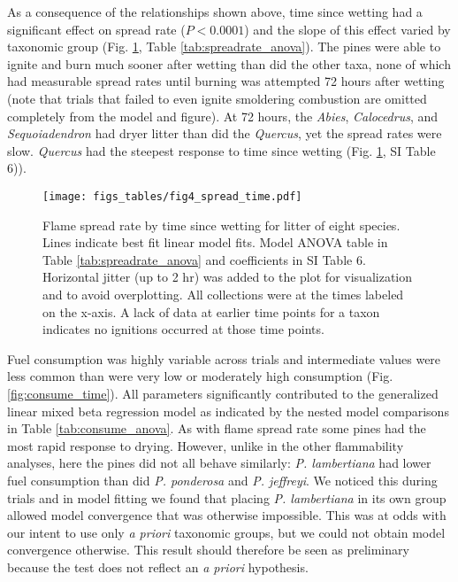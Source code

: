\documentclass[letterpaper,12pt]{article}
\begin{document}
As a consequence of the relationships shown above, time since wetting had a
significant effect on spread rate ($P < 0.0001$) and the slope of this effect
varied by taxonomic group (Fig. \ref{fig:spread_time}, Table
\ref{tab:spreadrate_anova}). The pines were able to ignite and burn much sooner
after wetting than did the other taxa, none of which had measurable spread
rates until burning was attempted 72 hours after wetting (note that trials that
failed to even ignite smoldering combustion are omitted completely from the
model and figure). At 72 hours, the \emph{Abies}, \emph{Calocedrus}, and
\emph{Sequoiadendron} had dryer litter than did the \emph{Quercus}, yet the
spread rates were slow. \emph{Quercus} had the steepest response to time since
wetting (Fig. \ref{fig:spread_time}, SI Table 6)).


\begin{figure}[h]
  \centering
\texttt{[image: figs\_tables/fig4\_spread\_time.pdf]}
\caption{Flame spread rate by time since wetting for litter of eight species.
  Lines indicate best fit linear model fits. Model ANOVA table in Table
  \ref{tab:spreadrate_anova} and coefficients in SI Table 6. Horizontal jitter
  (up to 2 hr) was added to the plot for visualization and to avoid
  overplotting. All collections were at the times labeled on the x-axis. A lack
  of data at earlier time points for a taxon indicates no ignitions occurred at
  those time points.}
\label{fig:spread_time}
\end{figure}

Fuel consumption was highly variable across trials and intermediate values were
less common than were very low or moderately high consumption (Fig.
\ref{fig:consume_time}). All parameters significantly contributed to the
generalized linear mixed beta regression model as indicated by the nested model
comparisons in Table \ref{tab:consume_anova}. As with flame spread rate some
pines had the most rapid response to drying. However, unlike in the other
flammability analyses, here the pines did not all behave similarly: \emph{P.
  lambertiana} had lower fuel consumption than did \emph{P. ponderosa} and
\emph{P. jeffreyi}. We noticed this during trials and in model fitting we found
that placing \emph{P. lambertiana} in its own group allowed model convergence
that was otherwise impossible. This was at odds with our intent to use only
\emph{a priori} taxonomic groups, but we could not obtain model convergence
otherwise. This result should therefore be seen as preliminary because the test
does not reflect an \emph{a priori} hypothesis.
\end{document}
